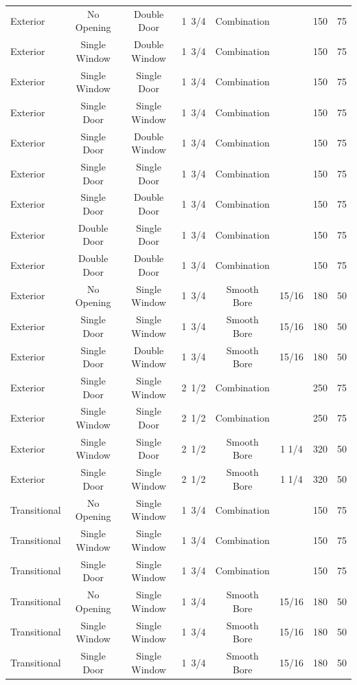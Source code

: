 \documentclass[12pt,oneside]{book}
\begin{document}
\begin{table}[!ht]
\begin{tabular}{lccccccc}
Exterior & No Opening      & Double Door     & 1~3/4 & Combination &       & 150 & 75 \\
Exterior & Single Window   & Double Window   & 1~3/4 & Combination &       & 150 & 75 \\
Exterior & Single Window   & Single Door     & 1~3/4 & Combination &       & 150 & 75 \\
Exterior & Single Door     & Single Window   & 1~3/4 & Combination &       & 150 & 75 \\
Exterior & Single Door     & Double Window   & 1~3/4 & Combination &       & 150 & 75 \\
Exterior & Single Door     & Single Door     & 1~3/4 & Combination &       & 150 & 75 \\
Exterior & Single Door     & Double Door     & 1~3/4 & Combination &       & 150 & 75 \\
Exterior & Double Door     & Single Door     & 1~3/4 & Combination &       & 150 & 75 \\
Exterior & Double Door     & Double Door     & 1~3/4 & Combination &       & 150 & 75 \\
\midrule
Exterior & No Opening      & Single Window   & 1~3/4 & Smooth Bore & 15/16 & 180 & 50 \\
Exterior & Single Door     & Single Window   & 1~3/4 & Smooth Bore & 15/16 & 180 & 50 \\
Exterior & Single Door     & Double Window   & 1~3/4 & Smooth Bore & 15/16 & 180 & 50 \\
\midrule
Exterior & Single Door     & Single Window   & 2~1/2 & Combination &       & 250 & 75 \\
Exterior & Single Window   & Single Door     & 2~1/2 & Combination &       & 250 & 75 \\
\midrule
Exterior & Single Window   & Single Door     & 2~1/2 & Smooth Bore & 1 1/4 & 320 & 50 \\
Exterior & Single Door     & Single Window   & 2~1/2 & Smooth Bore & 1 1/4 & 320 & 50 \\
\midrule
Transitional & No Opening  & Single Window   & 1~3/4 & Combination &  & 150 & 75 \\
Transitional & Single Window & Single Window & 1~3/4 & Combination &  & 150 & 75 \\
Transitional & Single Door & Single Window   & 1~3/4 & Combination &  & 150 & 75 \\
\midrule
Transitional & No Opening  & Single Window   & 1~3/4 & Smooth Bore & 15/16 & 180 & 50 \\
Transitional & Single Window & Single Window & 1~3/4 & Smooth Bore & 15/16 & 180 & 50 \\
Transitional & Single Door & Single Window   & 1~3/4 & Smooth Bore & 15/16 & 180 & 50 \\ 
\bottomrule[1.25pt]
\end{tabular}
\end{table}
\end{document}
